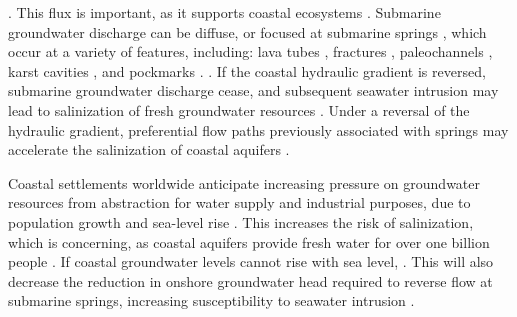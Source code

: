 \documentclass[draft, 10pt]{agujournal2019}
\begin{document}
 \cite{arevalo-martinez_ideas_2023, taniguchi_submarine_2019, moore_effect_2010}. This flux is important, as it  supports coastal ecosystems \cite{burnett_groundwater_2003, moore_effect_2010}. Submarine groundwater discharge can be diffuse, or focused at submarine springs \cite{taniguchi_submarine_2019}, which occur at a variety of features, including: lava tubes \cite{swarzenski_observations_2017}, fractures \cite{bokuniewicz_direct_2008, taniguchi_temporal_2008}, paleochannels \cite{mulligan_role_2007}, karst cavities \cite{fleury_submarine_2007}, and pockmarks \cite{hoffmann_fresh_2023, schluter_spatial_2004}. 
 \cite{taniguchi_submarine_2019, lee_submarine_2016, dulai_autonomous_2016}.
If the coastal hydraulic gradient is reversed,  submarine groundwater discharge  cease, and subsequent seawater intrusion may lead to salinization of fresh groundwater resources \cite{werner_seawater_2013, taniguchi_submarine_2019}. Under a reversal of the hydraulic gradient, preferential flow paths previously associated with springs may accelerate the salinization of coastal aquifers \cite{geng_preferential_2020, xu_long_2016, falls_hydrogeology_2005}. 

Coastal settlements worldwide anticipate increasing pressure on groundwater resources from abstraction for water supply and industrial purposes, due to population growth and sea-level rise \cite{michael_science_2017, oude_essink_effects_2010}. This increases the risk of salinization, which is concerning, as coastal aquifers provide fresh water for over one billion people  \cite{ferguson_vulnerability_2012}. If coastal groundwater levels cannot rise with sea level,  \cite{morgan_sea-level_2024}. This will also decrease the reduction in onshore groundwater head required to reverse flow at submarine springs, increasing susceptibility to seawater intrusion \cite{werner_classification_2017}.
\end{document}
